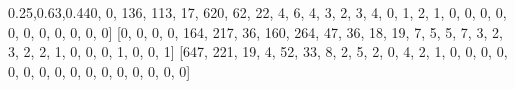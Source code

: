 \documentclass[
]{article}
\newenvironment{Shaded}{}{}
\newcommand{\DecValTok}[1]{\textcolor[rgb]{0.25,0.63,0.44}{#1}}
\newcommand{\NormalTok}[1]{#1}
\begin{document}
\begin{Shaded}
\begin{Highlighting}[]
\NormalTok{[}\DecValTok{0}\NormalTok{, }\DecValTok{0}\NormalTok{, }\DecValTok{136}\NormalTok{, }\DecValTok{113}\NormalTok{, }\DecValTok{17}\NormalTok{, }\DecValTok{620}\NormalTok{, }\DecValTok{62}\NormalTok{, }\DecValTok{22}\NormalTok{, }\DecValTok{4}\NormalTok{, }\DecValTok{6}\NormalTok{, }\DecValTok{4}\NormalTok{, }\DecValTok{3}\NormalTok{, }\DecValTok{2}\NormalTok{, }\DecValTok{3}\NormalTok{, }\DecValTok{4}\NormalTok{, }\DecValTok{0}\NormalTok{, }\DecValTok{1}\NormalTok{, }\DecValTok{2}\NormalTok{, }\DecValTok{1}\NormalTok{, }\DecValTok{0}\NormalTok{, }\DecValTok{0}\NormalTok{, }\DecValTok{0}\NormalTok{, }\DecValTok{0}\NormalTok{, }\DecValTok{0}\NormalTok{, }\DecValTok{0}\NormalTok{, }\DecValTok{0}\NormalTok{, }\DecValTok{0}\NormalTok{, }\DecValTok{0}\NormalTok{, }\DecValTok{0}\NormalTok{, }\DecValTok{0}\NormalTok{]}
\NormalTok{[}\DecValTok{0}\NormalTok{, }\DecValTok{0}\NormalTok{, }\DecValTok{0}\NormalTok{, }\DecValTok{0}\NormalTok{, }\DecValTok{164}\NormalTok{, }\DecValTok{217}\NormalTok{, }\DecValTok{36}\NormalTok{, }\DecValTok{160}\NormalTok{, }\DecValTok{264}\NormalTok{, }\DecValTok{47}\NormalTok{, }\DecValTok{36}\NormalTok{, }\DecValTok{18}\NormalTok{, }\DecValTok{19}\NormalTok{, }\DecValTok{7}\NormalTok{, }\DecValTok{5}\NormalTok{, }\DecValTok{5}\NormalTok{, }\DecValTok{7}\NormalTok{, }\DecValTok{3}\NormalTok{, }\DecValTok{2}\NormalTok{, }\DecValTok{3}\NormalTok{, }\DecValTok{2}\NormalTok{, }\DecValTok{2}\NormalTok{, }\DecValTok{1}\NormalTok{, }\DecValTok{0}\NormalTok{, }\DecValTok{0}\NormalTok{, }\DecValTok{0}\NormalTok{, }\DecValTok{1}\NormalTok{, }\DecValTok{0}\NormalTok{, }\DecValTok{0}\NormalTok{, }\DecValTok{1}\NormalTok{]}
\NormalTok{[}\DecValTok{647}\NormalTok{, }\DecValTok{221}\NormalTok{, }\DecValTok{19}\NormalTok{, }\DecValTok{4}\NormalTok{, }\DecValTok{52}\NormalTok{, }\DecValTok{33}\NormalTok{, }\DecValTok{8}\NormalTok{, }\DecValTok{2}\NormalTok{, }\DecValTok{5}\NormalTok{, }\DecValTok{2}\NormalTok{, }\DecValTok{0}\NormalTok{, }\DecValTok{4}\NormalTok{, }\DecValTok{2}\NormalTok{, }\DecValTok{1}\NormalTok{, }\DecValTok{0}\NormalTok{, }\DecValTok{0}\NormalTok{, }\DecValTok{0}\NormalTok{, }\DecValTok{0}\NormalTok{, }\DecValTok{0}\NormalTok{, }\DecValTok{0}\NormalTok{, }\DecValTok{0}\NormalTok{, }\DecValTok{0}\NormalTok{, }\DecValTok{0}\NormalTok{, }\DecValTok{0}\NormalTok{, }\DecValTok{0}\NormalTok{, }\DecValTok{0}\NormalTok{, }\DecValTok{0}\NormalTok{, }\DecValTok{0}\NormalTok{, }\DecValTok{0}\NormalTok{, }\DecValTok{0}\NormalTok{]}
\end{Highlighting}
\end{Shaded}
\end{document}
